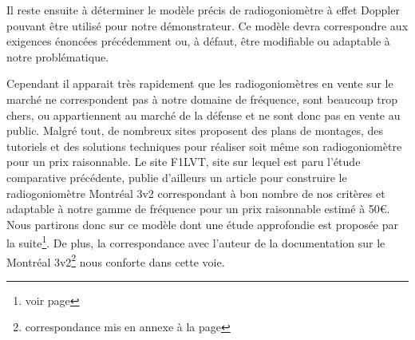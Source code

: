 Il reste ensuite à déterminer le modèle précis de radiogoniomètre à effet Doppler pouvant être utilisé pour notre démonstrateur. Ce modèle devra correspondre aux exigences énoncées précédemment ou, à défaut, être modifiable ou adaptable à notre problématique.

Cependant il apparait très rapidement que les radiogoniomètres en vente sur le marché ne correspondent pas à notre domaine de fréquence, sont beaucoup trop chers, ou appartiennent au marché de la défense et ne sont donc pas en vente au public. Malgré tout, de nombreux sites proposent des plans de montages, des tutoriels et des solutions techniques pour réaliser soit même son radiogoniomètre pour un prix raisonnable. Le site F1LVT, site sur lequel est paru l'étude comparative précédente, publie d'ailleurs un article pour construire le radiogoniomètre Montréal 3v2 correspondant à bon nombre de nos critères et adaptable à notre gamme de fréquence pour un prix raisonnable estimé à 50\euro. Nous partirons donc sur ce modèle dont une étude approfondie est proposée par la suite\footnote{voir page \pageref{montreal}}. De plus, la correspondance avec l'auteur de la documentation sur le Montréal 3v2\footnote{correspondance mis en annexe à la page \pageref{chap:mail}} nous conforte dans cette voie.

